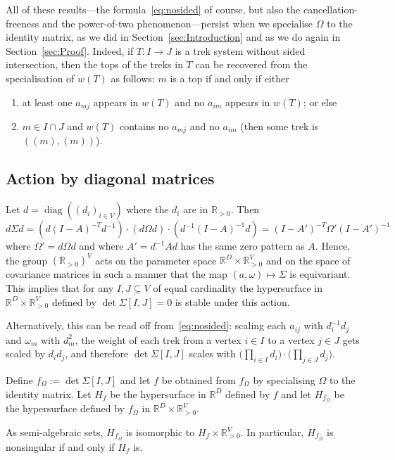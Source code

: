 \documentclass[ALCO,ThmDefs,Unicode]{cedram}
\DeclareMathOperator{\diag}{diag}
\newcommand{\RR}{\mathbb{R}}
\begin{document}
All of these results---the formula~\eqref{eq:nosided} of course, but also the cancellation-freeness and the power-of-two phenomenon---persist when we specialise $\Omega$ to the identity matrix, as we did in Section~\ref{sec:Introduction} and as we do again in Section~\ref{sec:Proof}. Indeed, if $T: I \to J$ is a trek system without sided intersection, then the tops of the treks in $T$ can be recovered from the specialisation of $w(T)$ as follows: $m$ is a top if and only if either
\begin{enumerate}
\item at least one $a_{mj}$ appears in $w(T)$ and no $a_{im}$ appears in $w(T)$; or else
\item $m \in I \cap J$ and $w(T)$ contains no $a_{mj}$ and no $a_{im}$ (then some trek is $((m),(m))$).
\end{enumerate}

\subsection*{Action by diagonal matrices}

Let $d=\diag((d_i)_{i \in V})$ where the $d_i$ are in $\RR_{>0}$. Then
\[
d \Sigma d= (d(I-A)^{-T}d^{-1}) \cdot (d \Omega d) \cdot (d^{-1}(I-A)^{-1}d)= (I-A')^{-T} \Omega' (I-A')^{-1}
\]
where $\Omega'=d \Omega d$ and where $A'=d^{-1}Ad$ has the same zero pattern as $A$. Hence, the group $(\RR_{>0})^V$ acts on the parameter space $\RR^D \times \RR_{>0}^V$ and on the space of covariance matrices in such a manner that the map $(a,\omega) \mapsto \Sigma$ is equivariant. This implies that for any $I, J \subseteq V$ of equal cardinality the hypersurface in $\RR^D \times \RR_{>0}^V$ defined by $\det \Sigma[I,J]=0$ is stable under this action.

Alternatively, this can be read off from~\eqref{eq:nosided}: scaling each $a_{ij}$ with $d_i^{-1} d_j$ and $\omega_m$ with $d_m^2$, the weight of each trek from a vertex $i \in I$ to a vertex $j \in J$ gets scaled by $d_i d_j$, and therefore $\det \Sigma[I,J]$ scales with $\big(\prod_{i \in I} d_i \big) \cdot \big(\prod_{j \in J} d_j\big)$.

Define $f_{\Omega}:=\det \Sigma[I,J]$ and let $f$ be obtained from $f_{\Omega}$ by specialising $\Omega$ to the identity matrix. Let $H_f$ be the hypersurface in $\RR^D$ defined by $f$ and let $H_{f_\Omega}$ be the hypersurface defined by $f_\Omega$ in $\RR^D \times \RR_{>0}^V$.

\begin{prop}\label{prop:unequal}
As semi-algebraic sets, $H_{f_\Omega}$ is isomorphic to $H_f \times
\RR_{>0}^V$. In particular, $H_{f_\Omega}$ is nonsingular if and only if $H_f$ is.
\end{prop}
\end{document}
